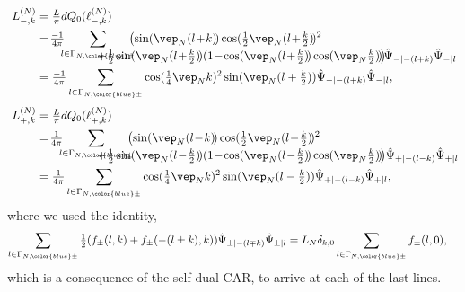 \documentclass[a4paper, 11pt]{article}
\DeclareMathOperator{\1}{\mathds{1}}
\begin{document}
\begin{align}
\label{eq:latvirasubchimaj}
L^{(N)}_{-,k} & = \tfrac{L}{\pi}dQ_{0}(\ell^{(N)}_{-,k}) \\ \nonumber
& = \!\tfrac{-1}{4\pi}\!\!\!\sum_{l\in\Gamma_{N,{\color{blue}\pm}}}\!\!\!\!\big(\!\sin(\vep_{N}(l\!+\!k)\!)\cos(\tfrac{1}{2}\vep_{N}(l\!+\!\tfrac{k}{2})\!)^{2} \\[-0.5cm] \nonumber
&\hspace{1.75cm}+\!\tfrac{1}{2}\sin(\vep_{N}(l\!+\!\tfrac{k}{2})\!)(1\!-\!\cos(\vep_{N}(l\!+\!\tfrac{k}{2})\!)\cos(\vep_{N}\tfrac{k}{2})\!)\!\big)\!\hat{\Psi}_{-|-(l+k)}\hat{\Psi}_{-|l} \\ \nonumber
& = \tfrac{-1}{4\pi}\sum_{l\in\Gamma_{N,{\color{blue}\pm}}}\cos(\tfrac{1}{4}\vep_{N}k)^{2}\sin(\vep_{N}(l+\tfrac{k}{2}))\hat{\Psi}_{-|-(l+k)}\hat{\Psi}_{-|l}, \\[0.1cm] \nonumber
L^{(N)}_{+,k} & = \tfrac{L}{\pi}dQ_{0}(\ell^{(N)}_{+,k}) \\ \nonumber
& = \!\tfrac{1}{4\pi}\!\!\!\sum_{l\in\Gamma_{N,{\color{blue}\pm}}}\!\!\!\!\big(\!\sin(\vep_{N}(l\!-\!k)\!)\cos(\tfrac{1}{2}\vep_{N}(l\!-\!\tfrac{k}{2})\!)^{2} \\[-0.5cm] \nonumber
&\hspace{1.75cm}+\!\tfrac{1}{2}\sin(\vep_{N}(l\!-\!\tfrac{k}{2})\!)(1\!-\!\cos(\vep_{N}(l\!-\!\tfrac{k}{2})\!)\cos(\vep_{N}\tfrac{k}{2})\!)\!\big)\hat{\Psi}_{+|-(l-k)}\hat{\Psi}_{+|l} \\ \nonumber
& = \tfrac{1}{4\pi}\sum_{l\in\Gamma_{N,{\color{blue}\pm}}}\cos(\tfrac{1}{4}\vep_{N}k)^{2}\sin(\vep_{N}(l-\tfrac{k}{2}))\hat{\Psi}_{+|-(l-k)}\hat{\Psi}_{+|l},
\end{align}
where we used the identity,
\begin{align}
\label{eq:latviramajantisym}
\sum_{l\in\Gamma_{N,{\color{blue}\pm}}}\tfrac{1}{2}(f_{\pm}(l,k)+f_{\pm}(-(l\pm k),k))\hat{\Psi}_{\pm|-(l\mp k)}\hat{\Psi}_{\pm|l} & = L_{N}\delta_{k,0}\sum_{l\in\Gamma_{N,{\color{blue}\pm}}}f_{\pm}(l,0),
\end{align}
 which is a consequence of the self-dual CAR, to arrive at each of the last lines.
\end{document}
